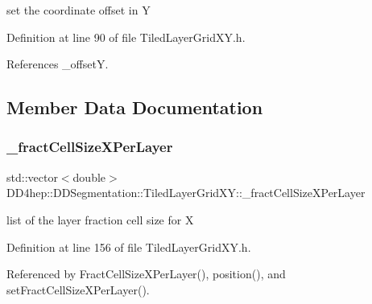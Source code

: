 set the coordinate offset in Y 



Definition at line 90 of file Tiled\+Layer\+Grid\+X\+Y.\+h.



References \+\_\+offsetY.



\subsection{Member Data Documentation}
\hypertarget{class_d_d4hep_1_1_d_d_segmentation_1_1_tiled_layer_grid_x_y_a459d90c7d9a34184e093dd0ce01e5157}{}\label{class_d_d4hep_1_1_d_d_segmentation_1_1_tiled_layer_grid_x_y_a459d90c7d9a34184e093dd0ce01e5157} 
\subsubsection{\texorpdfstring{\+\_\+fract\+Cell\+Size\+X\+Per\+Layer}{\_fractCellSizeXPerLayer}}
{\footnotesize\ttfamily std\+::vector$<$double$>$ D\+D4hep\+::\+D\+D\+Segmentation\+::\+Tiled\+Layer\+Grid\+X\+Y\+::\+\_\+fract\+Cell\+Size\+X\+Per\+Layer\hspace{0.3cm}{\ttfamily [protected]}}



list of the layer fraction cell size for X 



Definition at line 156 of file Tiled\+Layer\+Grid\+X\+Y.\+h.



Referenced by Fract\+Cell\+Size\+X\+Per\+Layer(), position(), and set\+Fract\+Cell\+Size\+X\+Per\+Layer().

\hypertarget{class_d_d4hep_1_1_d_d_segmentation_1_1_tiled_layer_grid_x_y_ab579117ca41778248009a661cbaa27b7}{}\label{class_d_d4hep_1_1_d_d_segmentation_1_1_tiled_layer_grid_x_y_ab579117ca41778248009a661cbaa27b7} 
